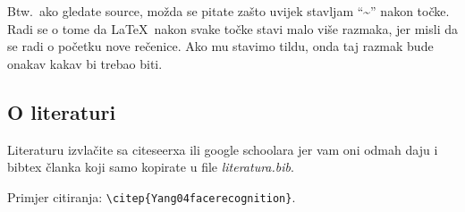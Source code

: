 \documentclass{article}
\begin{document}
Btw.~ako gledate source, možda se pitate zašto uvijek stavljam ``\textasciitilde{}''
nakon točke. Radi se o tome da \LaTeX~nakon svake točke stavi malo više
razmaka, jer misli da se radi o početku nove rečenice. Ako mu stavimo tildu,
onda taj razmak bude onakav kakav bi trebao biti.

\subsection{O literaturi}
Literaturu izvlačite sa citeseerxa ili google schoolara jer vam oni odmah daju
i bibtex članka koji samo kopirate u file \emph{literatura.bib}.

Primjer citiranja: \verb|\citep{Yang04facerecognition}|.
\end{document}
